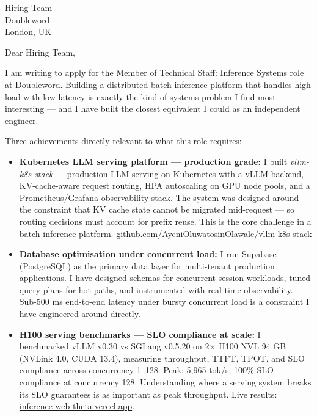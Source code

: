 \documentclass[12pt,a4paper]{letter}
\date{\today}
\begin{document}
\begin{letter}{Hiring Team \\ Doubleword \\ London, UK}

\opening{Dear Hiring Team,}

I am writing to apply for the Member of Technical Staff: Inference Systems role at Doubleword. Building a distributed batch inference platform that handles high load with low latency is exactly the kind of systems problem I find most interesting — and I have built the closest equivalent I could as an independent engineer.

Three achievements directly relevant to what this role requires:

\begin{itemize}
  \item \textbf{Kubernetes LLM serving platform — production grade:} I built \textit{vllm-k8s-stack} — production LLM serving on Kubernetes with a vLLM backend, KV-cache-aware request routing, HPA autoscaling on GPU node pools, and a Prometheus/Grafana observability stack. The system was designed around the constraint that KV cache state cannot be migrated mid-request — so routing decisions must account for prefix reuse. This is the core challenge in a batch inference platform. \href{https://github.com/AyeniOluwatosinOlawale/vllm-k8s-stack}{github.com/AyeniOluwatosinOlawale/vllm-k8s-stack}

  \item \textbf{Database optimisation under concurrent load:} I run Supabase (PostgreSQL) as the primary data layer for multi-tenant production applications. I have designed schemas for concurrent session workloads, tuned query plans for hot paths, and instrumented with real-time observability. Sub-500 ms end-to-end latency under bursty concurrent load is a constraint I have engineered around directly.

  \item \textbf{H100 serving benchmarks — SLO compliance at scale:} I benchmarked vLLM v0.30 vs SGLang v0.5.20 on 2$\times$ H100 NVL 94 GB (NVLink 4.0, CUDA 13.4), measuring throughput, TTFT, TPOT, and SLO compliance across concurrency 1--128. Peak: 5,965 tok/s; 100\% SLO compliance at concurrency 128. Understanding where a serving system breaks its SLO guarantees is as important as peak throughput. Live results: \href{https://inference-web-theta.vercel.app/benchmarks/llm}{inference-web-theta.vercel.app}.
\end{itemize}


\end{letter}
\end{document}
